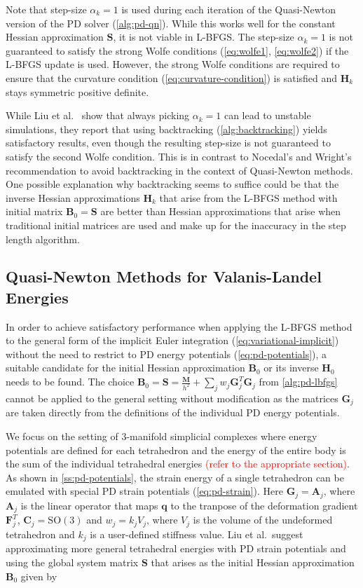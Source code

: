 Note that step-size $\alpha_k = 1$ is 
used during each iteration of the Quasi-Newton version of the PD solver (\cref{alg:pd-qn}).
While this works well for the constant Hessian approximation $\bm{S}$, it is not viable in L-BFGS. The step-size $\alpha_k = 1$
is not guaranteed to satisfy the strong Wolfe conditions (\cref{eq:wolfe1}, \cref{eq:wolfe2}) if the L-BFGS update is used. However,
the strong Wolfe conditions are required to ensure that the curvature condition (\cref{eq:curvature-condition}) is satisfied 
and $\bm{H}_k$ stays symmetric positive definite. 

While Liu et al.\ \cite{liu2017} show that always picking $\alpha_k = 1$ can lead to
unstable simulations, they report that using backtracking (\cref{alg:backtracking}) yields satisfactory results, even though 
the resulting step-size is not guaranteed to satisfy the second Wolfe condition. This is in contrast to Nocedal's and Wright's
recommendation \cite{nocedal2006} to avoid backtracking in the context of  Quasi-Newton methods. One possible explanation why 
backtracking seems to suffice could be that the inverse 
Hessian approximations $\bm{H}_k$ that arise from the L-BFGS method with initial matrix $\bm{B}_0 = \bm{S}$ are better than
Hessian approximations that arise when traditional initial matrices are used and make up for the inaccuracy in the step length
algorithm.

\subsection{Quasi-Newton Methods for Valanis-Landel Energies}\label{ss:qn-valanis-landel}
In order to achieve satisfactory performance when applying the L-BFGS method to the general form of the implicit Euler integration 
(\cref{eq:variational-implicit}) without the need to restrict to PD energy potentials (\cref{eq:pd-potentials}), a suitable
candidate for the initial Hessian approximation $\bm{B}_0$ or its inverse $\bm{H}_0$ needs to be found. The choice $\bm{B}_0 = 
\bm{S} = \frac{\bm{M}}{h^2} + \sum_j w_j \bm{G}_j^T \bm{G}_j$ from \cref{alg:pd-lbfgs} cannot be applied to the general setting 
without modification as the matrices $\bm{G}_j$ are taken directly from the definitions of the individual PD energy potentials.

We focus on the setting of 3-manifold simplicial complexes where energy potentials are defined for each tetrahedron and the
energy of the entire body is the sum of the individual tetrahedral energies \textcolor{red}{(refer to the appropriate section)}.
As shown in \cref{ss:pd-potentials}, the strain energy of a single tetrahedron can be emulated with special PD strain 
potentials (\cref{eq:pd-strain}). Here $\bm{G}_j = \bm{A}_j$, where $\bm{A}_j$ is the linear operator that maps $\bm{q}$ 
to the tranpose of the deformation gradient $\bm{F}^T_j$, $\bm{C}_j = \text{SO}(3)$ and $w_j = k_jV_j$, where $V_j$ is the
volume of the undeformed tetrahedron and $k_j$ is a user-defined stiffness value. 
Liu et al.\ suggest approximating more general tetrahedral energies with PD strain potentials and using the global system
matrix $\bm{S}$ that arises as the initial Hessian approximation $\bm{B}_0$ given by


